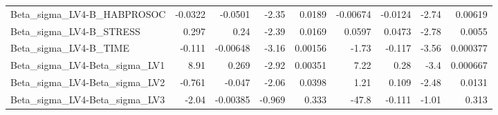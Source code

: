 \begin{tabular}{lrrrrrrrr}
Beta\_sigma\_LV4-B\_HABPROSOC    &     -0.0322 &      -0.0501 &   -2.35 &   0.0189 &   -0.00674 &     -0.0124 &        -2.74 &       0.00619 \\
Beta\_sigma\_LV4-B\_STRESS       &       0.297 &         0.24 &   -2.39 &   0.0169 &     0.0597 &      0.0473 &        -2.78 &        0.0055 \\
Beta\_sigma\_LV4-B\_TIME         &      -0.111 &     -0.00648 &   -3.16 &  0.00156 &      -1.73 &      -0.117 &        -3.56 &      0.000377 \\
Beta\_sigma\_LV4-Beta\_sigma\_LV1 &        8.91 &        0.269 &   -2.92 &  0.00351 &       7.22 &        0.28 &         -3.4 &      0.000667 \\
Beta\_sigma\_LV4-Beta\_sigma\_LV2 &      -0.761 &       -0.047 &   -2.06 &   0.0398 &       1.21 &       0.109 &        -2.48 &        0.0131 \\
Beta\_sigma\_LV4-Beta\_sigma\_LV3 &       -2.04 &     -0.00385 &  -0.969 &    0.333 &      -47.8 &      -0.111 &        -1.01 &         0.313 \\
\bottomrule
\end{tabular}
